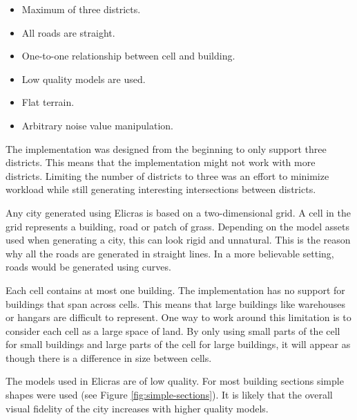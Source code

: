 \begin{itemize}
	\setlength\itemsep{0.01cm}
	\item Maximum of three districts.
	\item All roads are straight.
	\item One-to-one relationship between cell and building.
	\item Low quality models are used.
	\item Flat terrain.
	\item Arbitrary noise value manipulation.
\end{itemize}
	
The implementation was designed from the beginning to only support three districts. This means that the implementation might not work with more districts. Limiting the number of districts to three was an effort to minimize workload while still generating interesting intersections between districts.
\par
Any city generated using Elicras is based on a two-dimensional grid. A cell in the grid represents a building, road or patch of grass. Depending on the model assets used when generating a city, this can look rigid and unnatural. This is the reason why all the roads are generated in straight lines. In a more believable setting, roads would be generated using curves\cite{CurvedRoads}.
\par
Each cell contains at most one building. The implementation has no support for buildings that span across cells. This means that large buildings like warehouses or hangars are difficult to represent. One way to work around this limitation is to consider each cell as a large space of land. By only using small parts of the cell for small buildings and large parts of the cell for large buildings, it will appear as though there is a difference in size between cells.
\par
The models used in Elicras are of low quality. For most building sections simple shapes were used (see Figure \ref{fig:simple-sections}). It is likely that the overall visual fidelity of the city increases with higher quality models.

